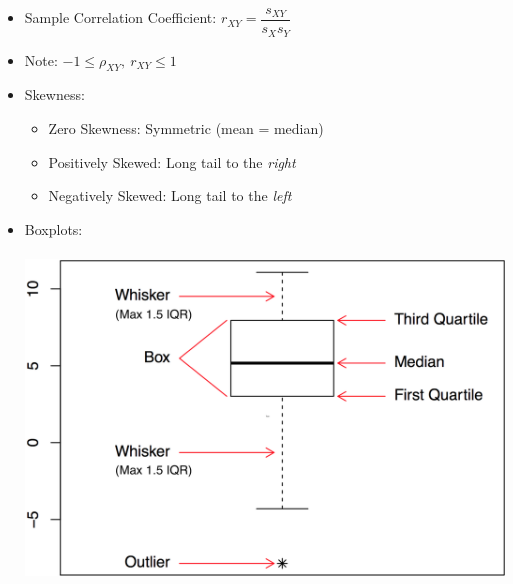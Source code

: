 \documentclass[%
 aip,
 jmp,%
 amsmath,amssymb,
 reprint,%
]{revtex4-1}
\begin{document}
\begin{itemize}[label={}]
\item Sample Correlation Coefficient: $r_{XY} = \dfrac{s_{XY}}{s_{X}s_{Y}}$
\item Note: $-1 \leq \rho_{XY},\ r_{XY} \leq 1$
\item Skewness:
\begin{itemize}[label={}]
\item Zero Skewness: Symmetric (mean = median)
\item Positively Skewed: Long tail to the \textit{right}
\item Negatively Skewed: Long tail to the \textit{left}
\end{itemize}
\item Boxplots:\\\\
\includegraphics[scale=0.24]{Boxplot}

\end{itemize}
\end{document}
